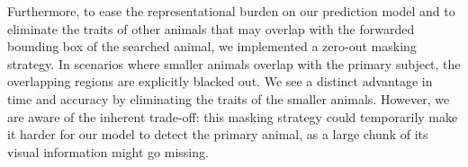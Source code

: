 Furthermore, to ease the representational burden on our prediction model and to eliminate the traits of other animals that may overlap with the forwarded bounding box of the searched animal,
 we implemented a zero-out masking strategy. In scenarios where smaller animals overlap with the primary subject, the overlapping regions are explicitly blacked out. We see a distinct advantage in 
 time and accuracy by eliminating the traits of the smaller animals. However, we are aware of the inherent trade-off: this masking strategy could temporarily make it harder for our model to detect 
 the primary animal, as a large chunk of its visual information might go missing.